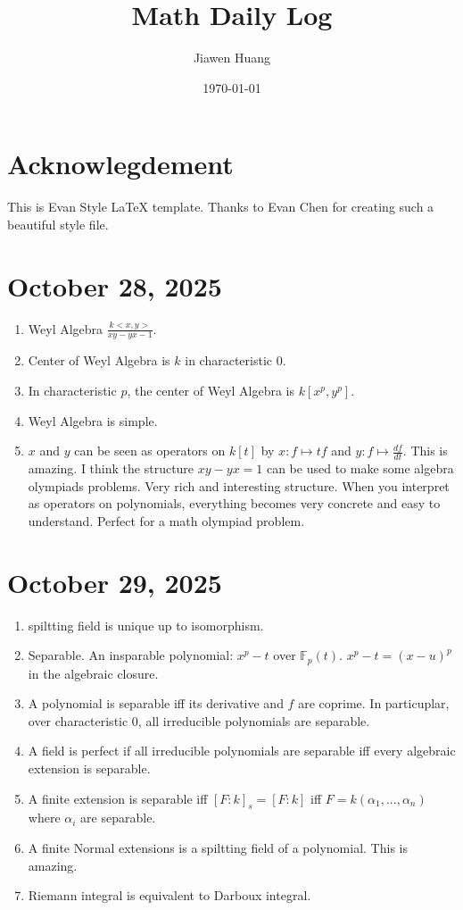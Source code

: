 \documentclass[15pt]{scrartcl}
\begin{document}
\title{Math Daily Log}
\date{\today}
\author{Jiawen Huang}
\maketitle
\section*{Acknowlegdement}
This is Evan Style LaTeX template. Thanks to Evan Chen for creating such a beautiful style file.
\section*{October 28, 2025}
\begin{enumerate}
\item Weyl Algebra $\frac{k<x,y>}{xy-yx-1}$. 
\item Center of Weyl Algebra is $k$ in characteristic 0.
\item In characteristic $p$, the center of Weyl Algebra is $k[x^p,y^p]$.
\item Weyl Algebra is simple.
\item $x$ and $y$ can be seen as operators on $k[t]$ by $x:f\mapsto tf$ and $y:f\mapsto \frac{df}{dt}$. This is amazing. 
I think the structure $xy-yx=1$ can be used to make some algebra olympiads problems. Very rich and interesting structure. 
When you interpret as operators on polynomials, everything becomes very concrete and easy to understand. Perfect for a math olympiad problem.

\end{enumerate}

\section*{October 29, 2025}
\begin{enumerate}
\item spiltting field is unique up to isomorphism.
\item Separable. An insparable polynomial: $x^p-t$ over $\mathbb{F}_p(t)$. $x^p-t=(x-u)^p$ in the algebraic closure. 
\item A polynomial is separable iff its derivative and $f$ are coprime. In particuplar, over characteristic 0, all irreducible polynomials are separable.
\item A field is perfect if all irreducible polynomials are separable iff every algebraic extension is separable. 
\item A finite extension is separable iff $[F:k]_s=[F:k]$ iff $F=k(\alpha_1,...,\alpha_n)$ where $\alpha_i$ are separable.
\item A finite Normal extensions is a spiltting field of a polynomial. This is amazing. 
\item Riemann integral is equivalent to Darboux integral.
\end{enumerate}
\end{document}
